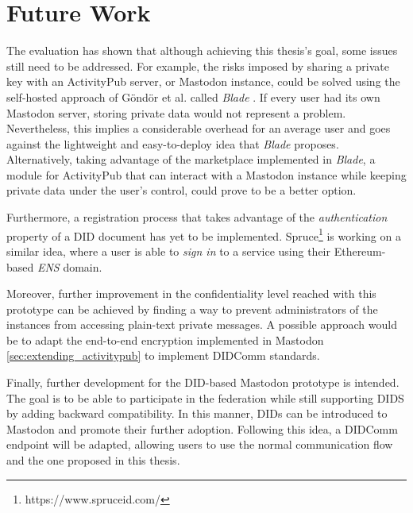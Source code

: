 \section{Future Work}
The evaluation has shown that although achieving this thesis's goal, some issues still need to be addressed. For example, the risks imposed by sharing a private key with an ActivityPub server, or Mastodon instance, could be solved using the self-hosted approach of Göndör et al. called \emph{Blade} \cite{inproceedings}. If every user had its own Mastodon server, storing private data would not represent a problem. Nevertheless, this implies a considerable overhead for an average user and goes against the lightweight and easy-to-deploy idea that \emph{Blade} proposes. Alternatively, taking advantage of the marketplace implemented in \emph{Blade}, a module for ActivityPub that can interact with a Mastodon instance while keeping private data under the user's control, could prove to be a better option. 

Furthermore, a registration process that takes advantage of the \emph{authentication} property of a DID document has yet to be implemented. Spruce\footnote{https://www.spruceid.com/} is working on a similar idea, where a user is able to \emph{sign in} to a service using their Ethereum-based \emph{ENS} domain.

Moreover, further improvement in the confidentiality level reached with this prototype can be achieved by finding a way to prevent administrators of the instances from accessing plain-text private messages. A possible approach would be to adapt the end-to-end encryption implemented in Mastodon \ref{sec:extending_activitypub} to implement DIDComm standards.  

Finally, further development for the DID-based Mastodon prototype is intended. The goal is to be able to participate in the federation while still supporting DIDS by adding backward compatibility. In this manner, DIDs can be introduced to Mastodon and promote their further adoption. Following this idea, a DIDComm endpoint will be adapted, allowing users to use the normal communication flow and the one proposed in this thesis.